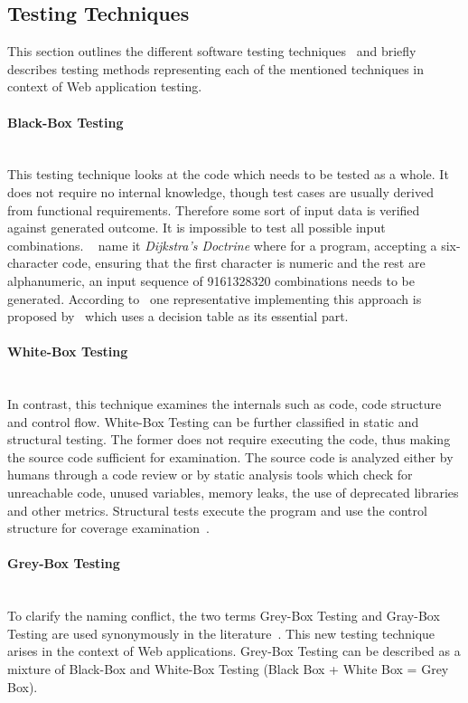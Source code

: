 \documentclass[12pt, notitlepage]{article}
\begin{document}
\subsection{Testing Techniques}
This section outlines the different software testing techniques~\cite{testing-methods} and briefly describes testing methods representing each of the mentioned techniques in context of Web application testing.
\paragraph{Black-Box Testing} ~\\
This testing technique looks at the code which needs to be tested as a whole. It does not require no internal knowledge, though test cases are usually 
derived from functional requirements. Therefore some sort of input data is verified against generated outcome.
It is impossible to test all possible input combinations. ~\citet{softare-testing-principles} name it \textit{Dijkstra's Doctrine}
where for a program, accepting a six-character code, ensuring that the first character is numeric and the rest are alphanumeric, an input 
sequence of 9161328320 combinations needs to be generated.
According to~\cite{testing-overview} one representative implementing this approach is proposed by~\citet{decision-table-testing} which uses a decision table as its essential part.  
\paragraph{White-Box Testing} ~\\
In contrast, this technique examines the internals such as code, code structure and control flow. White-Box Testing can be further classified in
static and structural testing. The former does not require executing the code, thus making the source code sufficient for examination. The source code
is analyzed either by humans through a code review or by static analysis tools which check for unreachable code, unused variables, memory leaks, the use of
deprecated libraries and other metrics. Structural tests execute the program and use the control structure for coverage examination~\cite{structural-testing}.
\paragraph{Grey-Box Testing} ~\\
To clarify the naming conflict, the two terms Grey-Box Testing and Gray-Box Testing are used synonymously in the literature~\cite{bridge-grey}. 
This new testing technique~\cite{web-engineering} arises in the context of Web applications. Grey-Box Testing can be described as a mixture of Black-Box and White-Box Testing (Black Box + White Box = Grey Box).
\end{document}
